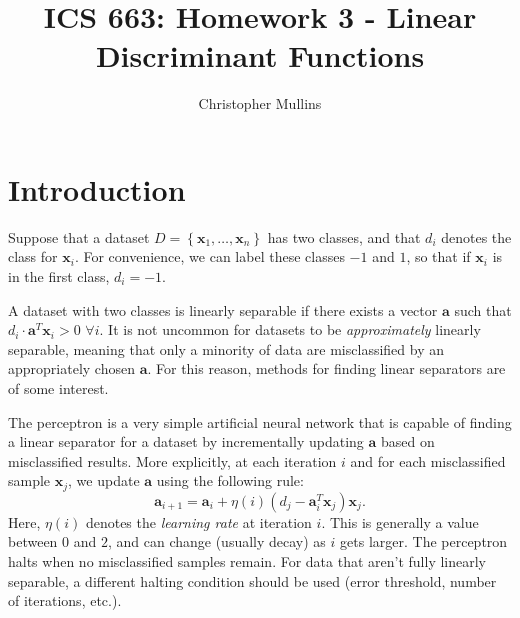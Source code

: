\documentclass{article}
\begin{document}
\title{ICS 663: Homework 3 - Linear Discriminant Functions}
\author{Christopher Mullins}
\maketitle

\noindent\hrulefill
\vspace{-5mm} %
\tableofcontents
\noindent\hrulefill

\section{Introduction}

Suppose that a dataset $D=\left\{ \mathbf{x}_1, \dots, \mathbf{x}_n \right\}$
has two classes, and that $d_i$ denotes the class for $\mathbf{x}_i$. For
convenience, we can label these classes $-1$ and $1$, so that if $\mathbf{x}_i$
is in the first class, $d_i=-1$.

A dataset with two classes is linearly separable if there exists a vector
$\mathbf{a}$ such that $d_i \cdot \mathbf{a}^{T} \mathbf{x}_i > 0$ $\forall i$.
It is not uncommon for datasets to be {\it approximately} linearly separable,
meaning that only a minority of data are misclassified by an appropriately
chosen $\mathbf{a}$. For this reason, methods for finding linear separators are
of some interest.

The perceptron is a very simple artificial neural network that is capable of
finding a linear separator for a dataset by incrementally updating $\mathbf{a}$
based on misclassified results. More explicitly, at each iteration $i$ and for
each misclassified sample $\mathbf{x}_j$, we update $\mathbf{a}$ using the
following rule:
\[
	\mathbf{a}_{i+1} = \mathbf{a}_i + \eta(i)
		\left(d_j - \mathbf{a}_i^T\mathbf{x}_j\right)\mathbf{x}_j.
\]
Here, $\eta(i)$ denotes the {\it learning rate} at iteration $i$. This is
generally a value between $0$ and $2$, and can change (usually decay) as $i$
gets larger. The perceptron halts when no misclassified samples remain. For data
that aren't fully linearly separable, a different halting condition should be
used (error threshold, number of iterations, etc.).
\end{document}
